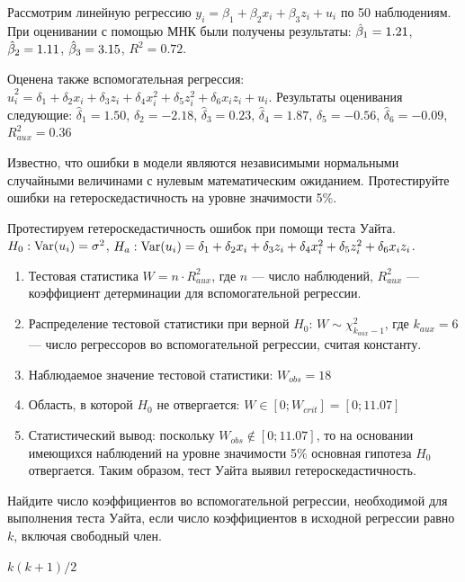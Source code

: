 \begin{problem}
Рассмотрим линейную регрессию $y_i = \beta_1 + \beta_2 x_i + \beta_3 z_i + u_i$ по 50 наблюдениям. При оценивании с помощью МНК были получены результаты: $\hat{\beta}_1=1.21$, $\hat{\beta}_2=1.11$, $\hat{\beta}_3=3.15$, $R^2=0.72$.

Оценена также вспомогательная регрессия: $\hat{u}^2_i=\delta_1+\delta_2 x_i +\delta_3 z_i+\delta_4 x_i^2+\delta_5 z_i^2+\delta_6 x_i z_i + u_i$. Результаты оценивания следующие: $\hat{\delta}_1=1.50$, $\hat{\delta}_2=-2.18$,  $\hat{\delta}_3=0.23$,  $\hat{\delta}_4=1.87$,  $\hat{\delta}_5=-0.56$,  $\hat{\delta}_6=-0.09$,  $R^2_{aux}=0.36$


Известно, что ошибки в модели являются независимыми нормальными случайными величинами с нулевым математическим ожиданием. Протестируйте
ошибки на гетероскедастичность на уровне значимости 5\%.


\begin{sol}
Протестируем гетероскедастичность ошибок при помощи теста Уайта. $H_0: \operatorname{Var}(u_i)=\sigma^2$, $H_a: \operatorname{Var}(u_i)=\delta_1+\delta_2 x_i +\delta_3 z_i+\delta_4 x_i^2+\delta_5 z_i^2+\delta_6 x_i z_i$.
\begin{enumerate}
\item Тестовая статистика $W=n\cdot R^2_{aux}$, где $n$ — число наблюдений, $R^2_{aux}$ — коэффициент детерминации для вспомогательной регрессии.
\item Распределение тестовой статистики при верной $H_0$: $W\sim \chi^2_{k_{aux}-1}$, где $k_{aux}=6$ — число регрессоров во вспомогательной регрессии, считая константу.
\item Наблюдаемое значение тестовой статистики: $W_{obs}=18$
\item Область, в которой $H_0$ не отвергается: $W\in [0;W_{crit}]=[0;11.07]$
\item Статистический вывод: поскольку $W_{obs} \notin [0;11.07]$, то на основании имеющихся наблюдений на уровне значимости 5\% основная гипотеза $H_0$ отвергается. Таким образом, тест Уайта выявил гетероскедастичность.
\end{enumerate}
\end{sol}
\end{problem}

\begin{problem}
Найдите число коэффициентов во вспомогательной регрессии, необходимой для выполнения теста Уайта, если число коэффициентов в исходной регрессии равно $k$, включая свободный член.

\begin{sol}
$k(k+1)/2$
\end{sol}
\end{problem}

